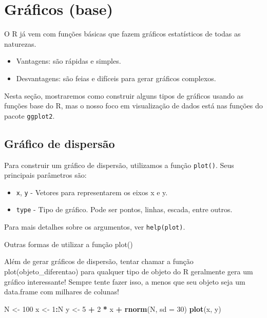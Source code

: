 \documentclass[
]{book}
\newenvironment{Shaded}{\begin{snugshade}}{\end{snugshade}}
\newcommand{\DataTypeTok}[1]{\textcolor[rgb]{0.13,0.29,0.53}{#1}}
\newcommand{\DecValTok}[1]{\textcolor[rgb]{0.00,0.00,0.81}{#1}}
\newcommand{\KeywordTok}[1]{\textcolor[rgb]{0.13,0.29,0.53}{\textbf{#1}}}
\newcommand{\NormalTok}[1]{#1}
\newcommand{\OperatorTok}[1]{\textcolor[rgb]{0.81,0.36,0.00}{\textbf{#1}}}
\newcommand{\StringTok}[1]{\textcolor[rgb]{0.31,0.60,0.02}{#1}}
\providecommand{\tightlist}{%
  \setlength{\itemsep}{0pt}\setlength{\parskip}{0pt}}
\begin{document}
\hypertarget{gruxe1ficos-base}{%
\section{Gráficos (base)}\label{gruxe1ficos-base}}

O R já vem com funções básicas que fazem gráficos estatísticos de todas as naturezas.

\begin{itemize}
\tightlist
\item
  Vantagens: são rápidas e simples.
\item
  Desvantagens: são feias e difíceis para gerar gráficos complexos.
\end{itemize}

Nesta seção, mostraremos como construir alguns tipos de gráficos usando as funções base do R, mas o nosso foco em visualização de dados está nas funções do pacote \texttt{ggplot2}.

\hypertarget{gruxe1fico-de-dispersuxe3o}{%
\subsection{Gráfico de dispersão}\label{gruxe1fico-de-dispersuxe3o}}

Para construir um gráfico de dispersão, utilizamos a função \texttt{plot()}. Seus principais parâmetros são:

\begin{itemize}
\tightlist
\item
  \texttt{x}, \texttt{y} - Vetores para representarem os eixos x e y.
\item
  \texttt{type} - Tipo de gráfico. Pode ser pontos, linhas, escada, entre outros.
\end{itemize}

Para mais detalhes sobre os argumentos, ver \texttt{help(plot)}.

Outras formas de utilizar a função plot()

Além de gerar gráficos de dispersão, tentar chamar a função plot(objeto\_diferentao) para qualquer tipo de objeto do R geralmente gera um gráfico interessante! Sempre tente fazer isso, a menos que seu objeto seja um data.frame com milhares de colunas!

\begin{Shaded}
\begin{Highlighting}[]
\NormalTok{N <-}\StringTok{ }\DecValTok{100}
\NormalTok{x <-}\StringTok{ }\DecValTok{1}\OperatorTok{:}\NormalTok{N}
\NormalTok{y <-}\StringTok{ }\DecValTok{5} \OperatorTok{+}\StringTok{ }\DecValTok{2} \OperatorTok{*}\StringTok{ }\NormalTok{x }\OperatorTok{+}\StringTok{ }\KeywordTok{rnorm}\NormalTok{(N, }\DataTypeTok{sd =} \DecValTok{30}\NormalTok{)}
\KeywordTok{plot}\NormalTok{(x, y)}
\end{Highlighting}
\end{Shaded}
\end{document}
